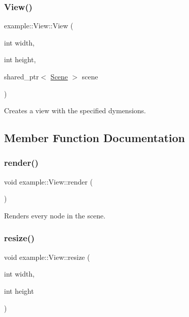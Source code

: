 \subsubsection{\texorpdfstring{View()}{View()}}
{\footnotesize\ttfamily example\+::\+View\+::\+View (\begin{DoxyParamCaption}\item[{int}]{width,  }\item[{int}]{height,  }\item[{shared\+\_\+ptr$<$ \mbox{\hyperlink{classexample_1_1_scene}{Scene}} $>$}]{scene }\end{DoxyParamCaption})}



Creates a view with the specified dymensions. 



\subsection{Member Function Documentation}
\mbox{\label{classexample_1_1_view_a10ea89fc705a2ba2252f673499524bf2}} 
\subsubsection{\texorpdfstring{render()}{render()}}
{\footnotesize\ttfamily void example\+::\+View\+::render (\begin{DoxyParamCaption}{ }\end{DoxyParamCaption})}



Renders every node in the scene. 

\mbox{\label{classexample_1_1_view_a2396337a1db393acefb174e386cde7d1}} 
\subsubsection{\texorpdfstring{resize()}{resize()}}
{\footnotesize\ttfamily void example\+::\+View\+::resize (\begin{DoxyParamCaption}\item[{int}]{width,  }\item[{int}]{height }\end{DoxyParamCaption})}



